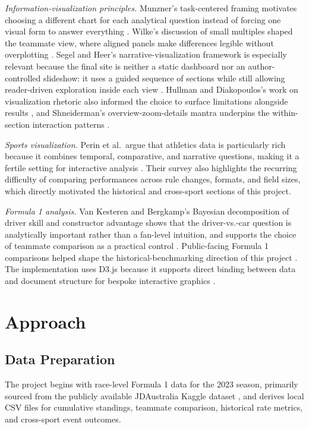 \documentclass[conference]{IEEEtran}
\begin{document}
\emph{Information-visualization principles.} Munzner's task-centered framing motivates choosing a different chart for each analytical question instead of forcing one visual form to answer everything \cite{munzner2014visualization}. Wilke's discussion of small multiples shaped the teammate view, where aligned panels make differences legible without overplotting \cite{wilke2019fundamentals}. Segel and Heer's narrative-visualization framework is especially relevant because the final site is neither a static dashboard nor an author-controlled slideshow: it uses a guided sequence of sections while still allowing reader-driven exploration inside each view \cite{segel2010narrative}. Hullman and Diakopoulos's work on visualization rhetoric also informed the choice to surface limitations alongside results \cite{hullman2011visualization}, and Shneiderman's overview-zoom-details mantra underpins the within-section interaction patterns \cite{shneiderman1996eyes}.

\emph{Sports visualization.} Perin et al.\ argue that athletics data is particularly rich because it combines temporal, comparative, and narrative questions, making it a fertile setting for interactive analysis \cite{perin2018sports}. Their survey also highlights the recurring difficulty of comparing performances across rule changes, formats, and field sizes, which directly motivated the historical and cross-sport sections of this project.

\emph{Formula 1 analysis.} Van Kesteren and Bergkamp's Bayesian decomposition of driver skill and constructor advantage shows that the driver-vs.-car question is analytically important rather than a fan-level intuition, and supports the choice of teammate comparison as a practical control \cite{vankesteren2023f1}. Public-facing Formula 1 comparisons helped shape the historical-benchmarking direction of this project \cite{seymour2023f1,sportschord2023verstappen}. The implementation uses D3.js because it supports direct binding between data and document structure for bespoke interactive graphics \cite{bostock2011d3,murray2017interactive}.

\section{Approach}

\subsection{Data Preparation}
The project begins with race-level Formula 1 data for the 2023 season, primarily sourced from the publicly available JDAustralia Kaggle dataset \cite{jdaustralia2023f1}, and derives local CSV files for cumulative standings, teammate comparison, historical rate metrics, and cross-sport event outcomes.
\end{document}
